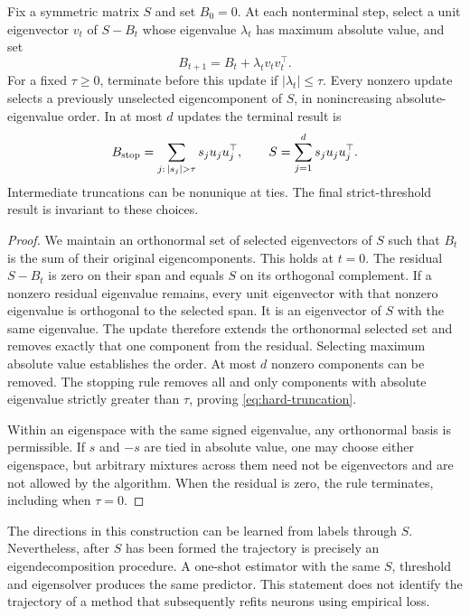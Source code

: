 \begin{theorem}
\label{thm:spectral-collapse}
Fix a symmetric matrix $S$ and set $B_0=0$. At each nonterminal step,
select a unit eigenvector $v_t$ of $S-B_t$ whose eigenvalue $\lambda_t$
has maximum absolute value, and set
\[
 B_{t+1}=B_t+\lambda_tv_tv_t^\top.
\]
For a fixed $\tau\geq0$, terminate before this update if
$|\lambda_t|\leq\tau$. Every nonzero update selects a previously
unselected eigencomponent of $S$, in nonincreasing absolute-eigenvalue
order. In at most $d$ updates the terminal result is
\begin{equation}
 B_{\rm stop}=\sum_{j:\,|s_j|>\tau}s_ju_ju_j^\top,
 \qquad S=\sum_{j=1}^d s_ju_ju_j^\top.
 \label{eq:hard-truncation}
\end{equation}
Intermediate truncations can be nonunique at ties.
The final strict-threshold result is invariant to these choices.
\end{theorem}
\begin{proof}
We maintain an orthonormal set of selected eigenvectors of $S$ such that
$B_t$ is the sum of their original eigencomponents. This holds at $t=0$.
The residual $S-B_t$ is zero on their span and equals $S$ on its
orthogonal complement. If a nonzero residual eigenvalue remains, every
unit eigenvector with that nonzero eigenvalue is orthogonal to the
selected span. It is an eigenvector of $S$ with the same eigenvalue.
The update therefore extends the orthonormal selected set and removes
exactly that one component from the residual. Selecting maximum absolute
value establishes the order. At most $d$ nonzero components can be
removed. The stopping rule removes all and only components with
absolute eigenvalue strictly greater than $\tau$, proving
\eqref{eq:hard-truncation}.

Within an eigenspace with the same signed eigenvalue, any orthonormal
basis is permissible. If $s$ and $-s$ are tied in absolute value, one
may choose either eigenspace, but arbitrary mixtures across them need
not be eigenvectors and are not allowed by the algorithm. When the
residual is zero, the rule terminates, including when $\tau=0$.
\end{proof}

The directions in this construction can be learned from labels through
$S$. Nevertheless, after $S$ has been formed the trajectory is precisely
an eigendecomposition procedure. A one-shot estimator with the same
$S$, threshold and eigensolver produces the same predictor. This statement
does not identify the trajectory of a method that subsequently refits
neurons using empirical loss.

